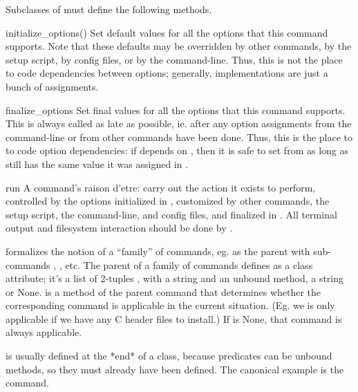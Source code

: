 \documentclass{manual}
\begin{document}
Subclasses of  must define the following methods.

\begin{methoddesc}{initialize_options()}
Set default values for all the options that this command
supports.  Note that these defaults may be overridden by other
commands, by the setup script, by config files, or by the
command-line.  Thus, this is not the place to code dependencies
between options; generally,  implementations
are just a bunch of  assignments.
\end{methoddesc}

\begin{methoddesc}{finalize_options}{}
Set final values for all the options that this command supports.
This is always called as late as possible, ie.  after any option
assignments from the command-line or from other commands have been
done.  Thus, this is the place to to code option dependencies: if
 depends on , then it is safe to set  from 
 as long as  still has the same value it was assigned in
.
\end{methoddesc}
\begin{methoddesc}{run}{}
A command's raison d'etre: carry out the action it exists to
perform, controlled by the options initialized in
, customized by other commands, the setup
script, the command-line, and config files, and finalized in
.  All terminal output and filesystem
interaction should be done by .
\end{methoddesc}

 formalizes the notion of a ``family'' of commands,
eg.  as the parent with sub-commands ,
, etc.  The parent of a family of commands
defines  as a class attribute; it's a list of
2-tuples , with  a string
and  an unbound method, a string or None.
 is a method of the parent command that
determines whether the corresponding command is applicable in the
current situation.  (Eg. we  is only applicable if
we have any C header files to install.)  If  is None,
that command is always applicable.

 is usually defined at the *end* of a class, because
predicates can be unbound methods, so they must already have been
defined.  The canonical example is the  command.

%
%

\renewcommand{\indexname}{Module Index}

\renewcommand{\indexname}{Index}
\end{document}
